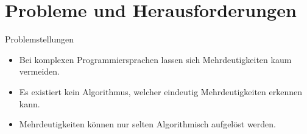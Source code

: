\documentclass[t]{beamer}
\begin{document}
	\section{Probleme und Herausforderungen}\label{sec:probleme-und-herausforderungen}
	\begin{frame}
		\begin{block}{Problemstellungen}
			\begin{itemize}
				\item Bei komplexen Programmiersprachen lassen sich Mehrdeutigkeiten kaum vermeiden.
				\item Es existiert kein Algorithmus, welcher eindeutig Mehrdeutigkeiten erkennen kann.
				\item Mehrdeutigkeiten können nur selten Algorithmisch aufgelöst werden.
			\end{itemize}
		\end{block}
	\end{frame}
\end{document}
